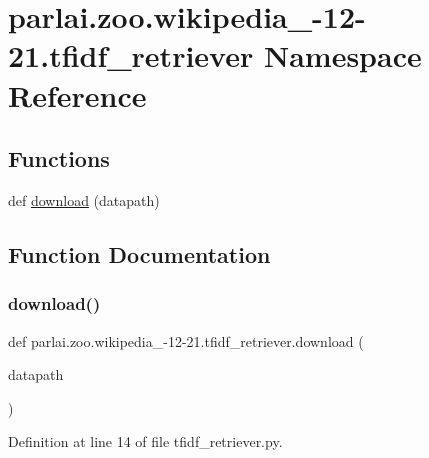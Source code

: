 \hypertarget{namespaceparlai_1_1zoo_1_1wikipedia__2016-12-21_1_1tfidf__retriever}{}\section{parlai.\+zoo.\+wikipedia\+\_-\/12-\/21.tfidf\+\_\+retriever Namespace Reference}
\label{namespaceparlai_1_1zoo_1_1wikipedia__2016-12-21_1_1tfidf__retriever}
\subsection*{Functions}
\begin{DoxyCompactItemize}
\item 
def \hyperlink{namespaceparlai_1_1zoo_1_1wikipedia__2016-12-21_1_1tfidf__retriever_ab7d8c33868c4641072b81d1d66602748}{download} (datapath)
\end{DoxyCompactItemize}


\subsection{Function Documentation}
\mbox{\label{namespaceparlai_1_1zoo_1_1wikipedia__2016-12-21_1_1tfidf__retriever_ab7d8c33868c4641072b81d1d66602748}} 
\subsubsection{\texorpdfstring{download()}{download()}}
{\footnotesize\ttfamily def parlai.\+zoo.\+wikipedia\+\_-\/12-\/21.tfidf\+\_\+retriever.\+download (\begin{DoxyParamCaption}\item[{}]{datapath }\end{DoxyParamCaption})}



Definition at line 14 of file tfidf\+\_\+retriever.\+py.



